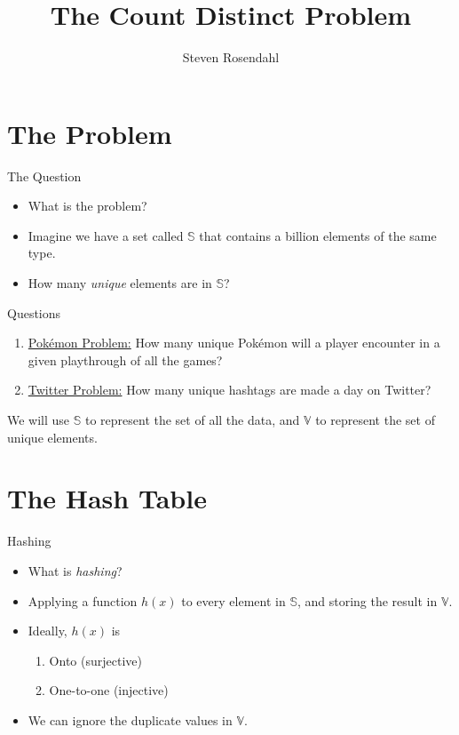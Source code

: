 \documentclass{beamer}
\title{The Count Distinct Problem}
\author{Steven Rosendahl}
\date{}
\begin{document}
\begin{frame}
\titlepage
\end{frame}

\section{The Problem}
\begin{frame}{The Question}
\begin{itemize}
\item What is the problem?
\pause
\item Imagine we have a set called $\mathbb{S}$ that contains a billion elements of the same type.
\pause
\item How many \textit{unique} elements are in $\mathbb{S}$?
\end{itemize}
\end{frame}

\begin{frame}{Questions}
\begin{enumerate}
\item \underline{Pok\'emon Problem:} How many unique Pok\'emon will a player encounter in a given playthrough of all the games?
\pause
\item \underline{Twitter Problem:} How many unique hashtags are made a day on Twitter?
\pause
\end{enumerate}
We will use $\mathbb{S}$ to represent the set of all the data, and $\mathbb{V}$ to represent the set of unique elements. 
\end{frame}

\section{The Hash Table}
\begin{frame}{Hashing}
\begin{itemize}
\item What is \textit{hashing}?
\pause
\item Applying a function $h(x)$ to every element in $\mathbb{S}$, and storing the result in $\mathbb{V}$.
\pause
\item Ideally, $h(x)$ is
\begin{enumerate}
\pause 
\item Onto (surjective)
\pause
\item One-to-one (injective)
\end{enumerate}
\pause
\item We can ignore the duplicate values in $\mathbb{V}$.
\end{itemize}
\end{frame}
\end{document}

